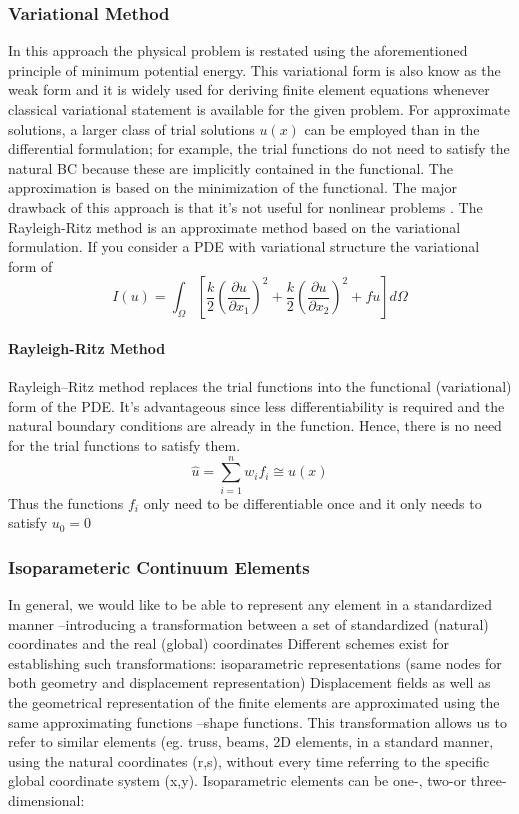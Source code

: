 \subsubsection{Variational Method}
In this approach the physical problem is restated using the aforementioned principle of minimum potential energy. This variational form is also know as the weak form and it is widely used for deriving finite element equations whenever classical variational statement is available for the given problem. For approximate solutions, a larger class of trial solutions $u(x)$ can be employed than in the differential formulation; for example, the trial functions do not need to satisfy the natural BC because these are implicitly contained in the functional. The approximation is based on the minimization of the functional.
The major drawback of this approach is that it's not useful for nonlinear problems . 
The Rayleigh-Ritz method is an approximate method based on the variational formulation.
If you consider a PDE with variational structure the variational form of 
\begin{equation}
I(u)=\int_{\Omega}[\frac{k}{2}\left(\frac{\partial u}{\partial x_1}\right)^2+\frac{k}{2}\left(\frac{\partial u}{\partial x_2}\right)^2 +fu]d\Omega
\end{equation}
\paragraph{Rayleigh-Ritz Method}
Rayleigh–Ritz method replaces the trial functions into the functional (variational) form of the PDE. It's advantageous since less differentiability is required and the natural boundary conditions are already in the function. Hence, there is no need for the trial functions to satisfy them.
\begin{equation}
\hat{u}=\sum_{i=1}^nw_if_i\cong u(x)
\end{equation}
Thus the functions $f_i$ only need to be differentiable once and it only needs to satisfy $u_0=0$



\subsubsection{Isoparameteric Continuum Elements}
In general, we would like to be able to represent any element in a standardized manner –introducing a transformation between a set of standardized (natural) coordinates and the real (global) coordinates
Different schemes exist for establishing such transformations: isoparametric representations (same nodes for both geometry and displacement representation)
Displacement fields as well as the geometrical representation of the finite elements are approximated using the same approximating functions –shape functions. This transformation allows us to refer to similar elements (eg. truss, beams, 2D elements, in a standard manner, using the natural coordinates (r,s), without every time referring to the specific global coordinate system (x,y).
Isoparametric elements can be one-, two-or three-dimensional:

